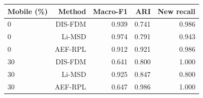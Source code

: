 \begin{tabular}{@{}lrrrr@{}}
\toprule
Mobile (\%) & Method & Macro-F1 & ARI & New recall \\
\midrule
0 & DIS-FDM & 0.939 & 0.741 & 0.986 \\
0 & Li-MSD & 0.974 & 0.791 & 0.943 \\
0 & AEF-RPL & 0.912 & 0.921 & 0.986 \\
30 & DIS-FDM & 0.641 & 0.800 & 1.000 \\
30 & Li-MSD & 0.925 & 0.847 & 0.800 \\
30 & AEF-RPL & 0.647 & 0.986 & 1.000 \\
\bottomrule
\end{tabular}
